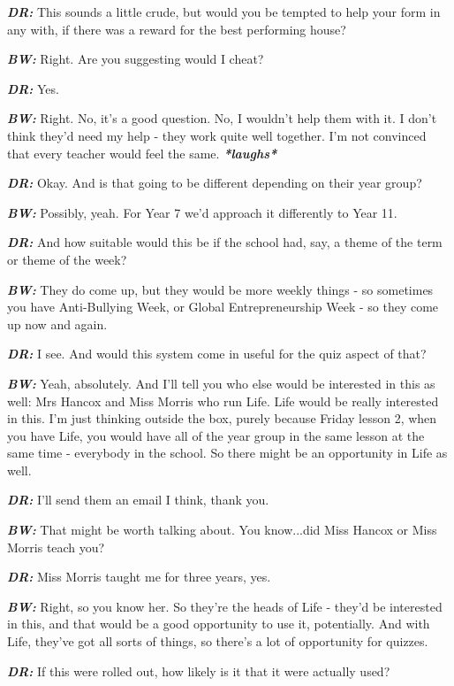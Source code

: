 \textit{\textbf{DR:}} This sounds a little crude, but would you be tempted to help your form in any with, if there was a reward for the best performing house?

\textit{\textbf{BW:}} Right. Are you suggesting would I cheat?

\textit{\textbf{DR:}} Yes.

\textit{\textbf{BW:}} Right. No, it's a good question. No, I wouldn't help them with it. I don't think they'd need my help - they work quite well together. I'm not convinced that every teacher would feel the same. \textit{\textbf{*laughs*}}

\textit{\textbf{DR:}} Okay. And is that going to be different depending on their year group?

\textit{\textbf{BW:}} Possibly, yeah. For Year 7 we'd approach it differently to Year 11.

\textit{\textbf{DR:}} And how suitable would this be if the school had, say, a theme of the term or theme of the week?

\textit{\textbf{BW:}} They do come up, but they would be more weekly things - so sometimes you have Anti-Bullying Week, or Global Entrepreneurship Week - so they come up now and again.

\textit{\textbf{DR:}} I see. And would this system come in useful for the quiz aspect of that?

\textit{\textbf{BW:}} Yeah, absolutely. And I'll tell you who else would be interested in this as well: Mrs Hancox and Miss Morris who run Life. Life would be really interested in this. I'm just thinking outside the box, purely because Friday lesson 2, when you have Life, you would have all of the year group in the same lesson at the same time - everybody in the school. So there might be an opportunity in Life as well.

\textit{\textbf{DR:}} I'll send them an email I think, thank you.

\textit{\textbf{BW:}} That might be worth talking about. You know...did Miss Hancox or Miss Morris teach you?

\textit{\textbf{DR:}} Miss Morris taught me for three years, yes.

\textit{\textbf{BW:}} Right, so you know her. So they're the heads of Life - they'd be interested in this, and that would be a good opportunity to use it, potentially. And with Life, they've got all sorts of things, so there's a lot of opportunity for quizzes.

\textit{\textbf{DR:}} If this were rolled out, how likely is it that it were actually used?

